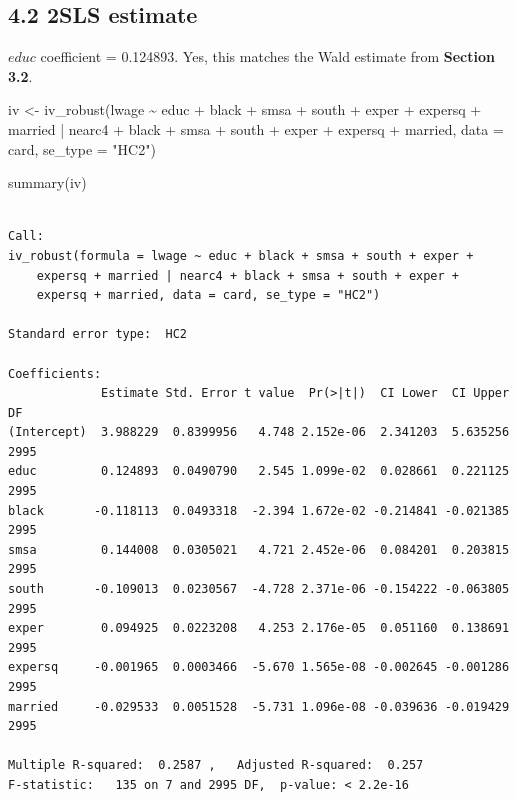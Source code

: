 \documentclass[
  letterpaper,
  DIV=11,
  numbers=noendperiod]{scrartcl}
\newenvironment{Shaded}{\begin{snugshade}}{\end{snugshade}}
\newcommand{\AttributeTok}[1]{\textcolor[rgb]{0.40,0.45,0.13}{#1}}
\newcommand{\FunctionTok}[1]{\textcolor[rgb]{0.28,0.35,0.67}{#1}}
\newcommand{\NormalTok}[1]{\textcolor[rgb]{0.00,0.23,0.31}{#1}}
\newcommand{\OtherTok}[1]{\textcolor[rgb]{0.00,0.23,0.31}{#1}}
\newcommand{\SpecialCharTok}[1]{\textcolor[rgb]{0.37,0.37,0.37}{#1}}
\newcommand{\StringTok}[1]{\textcolor[rgb]{0.13,0.47,0.30}{#1}}
\begin{document}
\subsection{4.2 2SLS estimate}\label{sls-estimate}

\(educ\) coefficient = 0.124893. Yes, this matches the Wald estimate
from \textbf{Section 3.2}.

\begin{Shaded}
\begin{Highlighting}[]
\NormalTok{iv }\OtherTok{\textless{}{-}} \FunctionTok{iv\_robust}\NormalTok{(lwage }\SpecialCharTok{\textasciitilde{}}\NormalTok{ educ }\SpecialCharTok{+}\NormalTok{ black }\SpecialCharTok{+}\NormalTok{ smsa }\SpecialCharTok{+}\NormalTok{ south }\SpecialCharTok{+}\NormalTok{ exper }\SpecialCharTok{+}\NormalTok{ expersq }\SpecialCharTok{+}\NormalTok{ married }\SpecialCharTok{|}
\NormalTok{                  nearc4 }\SpecialCharTok{+}\NormalTok{ black }\SpecialCharTok{+}\NormalTok{ smsa }\SpecialCharTok{+}\NormalTok{ south }\SpecialCharTok{+}\NormalTok{ exper }\SpecialCharTok{+}\NormalTok{ expersq }\SpecialCharTok{+}\NormalTok{ married,}
                \AttributeTok{data =}\NormalTok{ card, }\AttributeTok{se\_type =} \StringTok{"HC2"}\NormalTok{)}

\FunctionTok{summary}\NormalTok{(iv)}
\end{Highlighting}
\end{Shaded}

\begin{verbatim}

Call:
iv_robust(formula = lwage ~ educ + black + smsa + south + exper + 
    expersq + married | nearc4 + black + smsa + south + exper + 
    expersq + married, data = card, se_type = "HC2")

Standard error type:  HC2 

Coefficients:
             Estimate Std. Error t value  Pr(>|t|)  CI Lower  CI Upper   DF
(Intercept)  3.988229  0.8399956   4.748 2.152e-06  2.341203  5.635256 2995
educ         0.124893  0.0490790   2.545 1.099e-02  0.028661  0.221125 2995
black       -0.118113  0.0493318  -2.394 1.672e-02 -0.214841 -0.021385 2995
smsa         0.144008  0.0305021   4.721 2.452e-06  0.084201  0.203815 2995
south       -0.109013  0.0230567  -4.728 2.371e-06 -0.154222 -0.063805 2995
exper        0.094925  0.0223208   4.253 2.176e-05  0.051160  0.138691 2995
expersq     -0.001965  0.0003466  -5.670 1.565e-08 -0.002645 -0.001286 2995
married     -0.029533  0.0051528  -5.731 1.096e-08 -0.039636 -0.019429 2995

Multiple R-squared:  0.2587 ,   Adjusted R-squared:  0.257 
F-statistic:   135 on 7 and 2995 DF,  p-value: < 2.2e-16
\end{verbatim}
\end{document}
